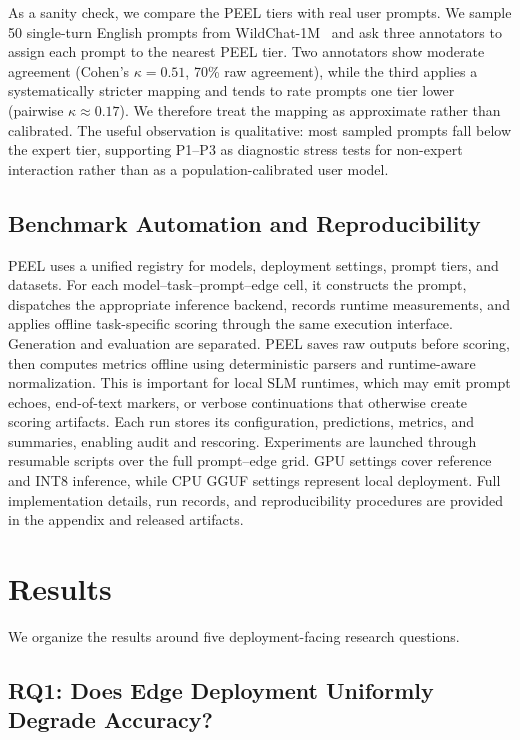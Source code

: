 \documentclass[letterpaper]{article} %
\begin{document}
As a sanity check, we compare the PEEL tiers with real user prompts. We sample
50 single-turn English prompts from WildChat-1M~\citep{wildchat2024} and ask
three annotators to assign each prompt to the nearest PEEL tier. Two annotators
show moderate agreement (Cohen's $\kappa=0.51$, 70\% raw agreement), while the
third applies a systematically stricter mapping and tends to rate prompts one
tier lower (pairwise $\kappa\approx0.17$). We therefore treat the mapping as
approximate rather than calibrated. The useful observation is qualitative: most
sampled prompts fall below the expert tier, supporting P1--P3 as diagnostic
stress tests for non-expert interaction rather than as a population-calibrated
user model.

\subsection{Benchmark Automation and Reproducibility}

PEEL uses a unified registry for models, deployment settings, prompt tiers, and datasets. For each model--task--prompt--edge cell, it constructs the prompt, dispatches the appropriate inference backend, records runtime measurements, and applies offline task-specific scoring through the same execution interface. Generation and evaluation are separated. PEEL saves raw outputs before scoring, then computes metrics offline using deterministic parsers and runtime-aware normalization. This is important for local SLM runtimes, which may emit prompt echoes, end-of-text markers, or verbose continuations that otherwise create scoring artifacts. Each run stores its configuration, predictions, metrics, and summaries, enabling audit and rescoring. Experiments are launched through resumable scripts over the full prompt--edge grid. GPU settings cover reference and INT8 inference, while CPU GGUF settings represent local deployment. Full implementation details, run records, and reproducibility procedures are provided in the appendix and released artifacts.

\section{Results}
\label{sec:results}

We organize the results around five deployment-facing research questions. 
\subsection{RQ1: Does Edge Deployment Uniformly Degrade Accuracy?}
\label{sec:runtime-results}
\end{document}
